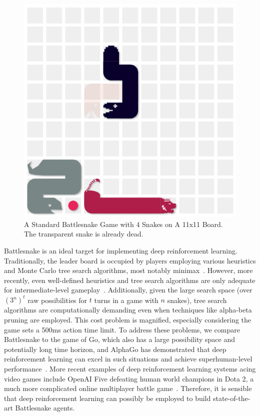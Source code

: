 \documentclass[a4paper]{article}
\begin{document}
\begin{figure}
    \centering
    \includegraphics[width=0.4\linewidth]{snake_game_screenshot.png}
    \caption{A Standard Battlesnake Game with 4 Snakes on A 11x11 Board.
        The transparent snake is already dead.
    }
    \label{fig:game}
\end{figure}

Battlesnake is an ideal target for implementing deep reinforcement learning.
Traditionally,
the leader board is occupied by players employing various heuristics and Monte
Carlo tree search algorithms,
most notably minimax~\cite{hill2018building,binnersley2020battlesnake}. However,
more recently,
even well-defined heuristics and tree search algorithms are only adequate for
intermediate-level gameplay~\cite{schier2019adversarial}. Additionally,
given the large search space (over $(3^n)^t$ raw possibilities for $t$ turns in
a game with $n$ snakes),
tree search algorithms are computationally demanding even when techniques like
alpha-beta pruning are employed. This cost problem is magnified,
especially considering the game sets a 500ms action time limit.
To address these problems, we compare Battlesnake to the game of Go,
which also has a large possibility space and potentially long time horizon,
and AlphaGo has demonstrated that deep reinforcement learning can excel in such
situations and achieve superhuman-level performance~\cite{silver2016mastering}.
More recent examples of deep reinforcement learning systems acing video games
include OpenAI Five defeating human world champions in Dota 2,
a much more complicated online multiplayer battle game~\cite{berner2019dota}.
Therefore,
it is sensible that deep reinforcement learning can possibly be employed to
build state-of-the-art Battlesnake agents.
\end{document}

